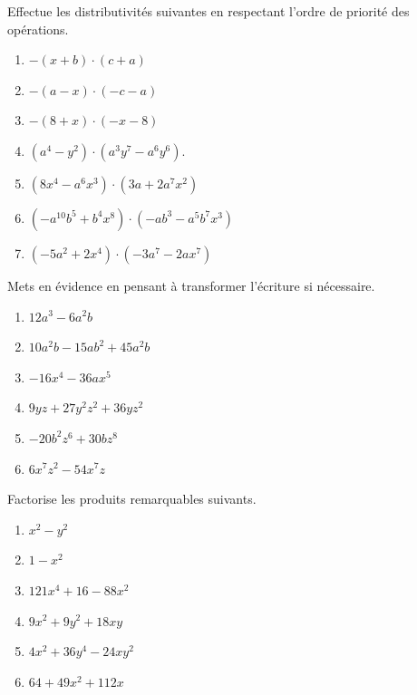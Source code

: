 \documentclass[12pt,parskip=half-, twoside=semi]{scrartcl}
\begin{document}
\begin{exercise}Effectue les distributivités suivantes en respectant l'ordre de priorité des opérations.
  \begin{enumerate}[cols=2]
     \item $-(x+b) \cdot(c+a)$
     \item $-(a-x) \cdot(-c-a)$
     \item $-(8+x) \cdot(-x-8)$
     \item $\left(a^4-y^2\right) \cdot\left(a^3 y^7-a^6 y^6\right)$.
     \item $\left(8 x^4-a^6 x^3\right) \cdot\left(3 a+2 a^7 x^2\right)$
     \item $\left(-a^{10} b^5+b^4 x^8\right) \cdot\left(-a b^3-a^5 b^7 x^3\right)$
     \item $\left(-5 a^2+2 x^4\right) \cdot\left(-3 a^7-2 a x^7\right)$
  \end{enumerate}
\end{exercise}

\begin{exercise}Mets en évidence en pensant à transformer l'écriture si nécessaire.
  \begin{enumerate}[cols=2]
      \item $12 a^3-6 a^2 b$
      \item $10 a^2 b-15 a b^2+45 a^2 b$
      \item $-16 x^4-36 a x^5$
      \item $9 y z+27 y^2 z^2+36 y z^2$
      \item $-20 b^2 z^6+30 b z^8$
      \item $6 x^7 z^2-54 x^7 z$
  \end{enumerate}
\end{exercise}

\begin{exercise}Factorise les produits remarquables suivants.
  \begin{enumerate}[cols=3]
    \item $x^2-y^2$
    \item $1-x^2$
    \item $121 x^4+16-88 x^2$
    \item $9 x^2+9 y^2+18 x y$
    \item $4 x^2+36 y^4-24 x y^2$
    \item $64+49 x^2+112 x$
  \end{enumerate}
\end{exercise}
\end{document}
